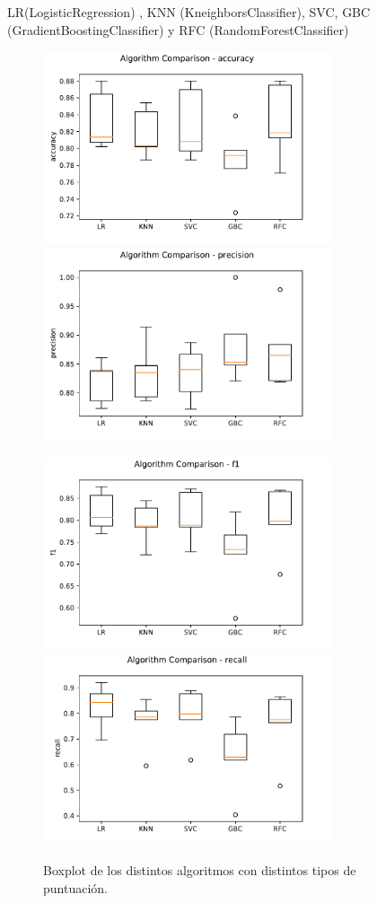 \documentclass[12pt,twoside]{report}
\begin{document}
LR(LogisticRegression) , KNN (KneighborsClassifier), SVC, GBC (GradientBoostingClassifier) y RFC (RandomForestClassifier)
\begin{figure}[ht]
\begin{multicols}{2}
\includegraphics[width=8.5cm]{./code/figures_python/comparison/accuracy.pdf}%
\columnbreak
\includegraphics[width=8.5cm]{./code/figures_python/comparison/precision.pdf}%
\end{multicols}
\begin{multicols}{2}
\includegraphics[width=8.5cm]{./code/figures_python/comparison/f1.pdf}%
\columnbreak
\includegraphics[width=8.5cm]{./code/figures_python/comparison/recall.pdf}%
\end{multicols}
 \caption{Boxplot de los distintos algoritmos con distintos tipos de puntuación.}
  \label{comp:alghoritms}
 \end{figure}
 
\end{document}
